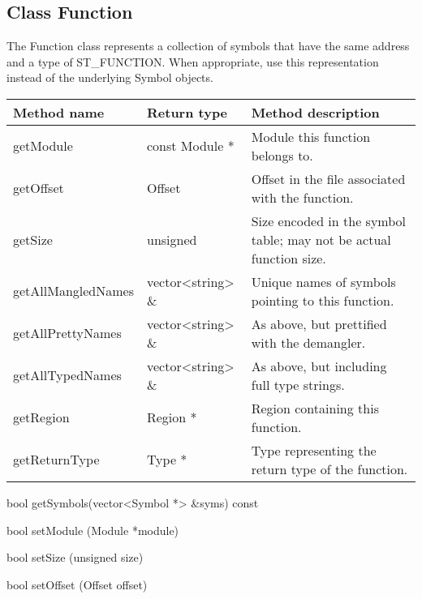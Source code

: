 \subsection{Class Function}\label{Function}
The Function class represents a collection of symbols that have the same address
and a type of ST\_FUNCTION. When appropriate, use this representation instead of the underlying Symbol objects. 

\begin{tabular}{|p{1.25in}|p{1.125in}|p{3.125in}|}
	\hline
	Method name & Return type & Method description \\
	\hline
	getModule & const Module * & Module this function belongs to. \\
	getOffset & Offset & Offset in the file associated with the function. \\
	getSize & unsigned & Size encoded in the symbol table; may not be actual function size. \\
	getAllMangledNames & vector<string> \& & Unique names of symbols pointing to this function. \\
	getAllPrettyNames & vector<string> \& & As above, but prettified with the demangler. \\
	getAllTypedNames & vector<string> \& & As above, but including full type strings. \\
	getRegion & Region * & Region containing this function. \\
	getReturnType & Type * & Type representing the return type of the function. \\
	\hline
\end{tabular}
	
\begin{apient}
bool getSymbols(vector<Symbol *> &syms) const
\end{apient}

\begin{apient}
bool setModule (Module *module)
\end{apient}

\begin{apient}
bool setSize (unsigned size)
\end{apient}

\begin{apient}
bool setOffset (Offset offset)
\end{apient}

